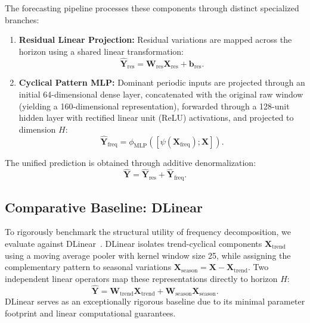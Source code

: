 \documentclass[journal]{IEEEtran}
\begin{document}
The forecasting pipeline processes these components through distinct specialized branches:
\begin{enumerate}
    \item \textbf{Residual Linear Projection:} Residual variations are mapped across the horizon using a shared linear transformation:
    \begin{equation}
    \widehat{\mathbf{Y}}_{\text{res}} = \mathbf{W}_{\text{res}} \mathbf{X}_{\text{res}} + \mathbf{b}_{\text{res}}.
    \end{equation}
    \item \textbf{Cyclical Pattern MLP:} Dominant periodic inputs are projected through an initial 64-dimensional dense layer, concatenated with the original raw window (yielding a 160-dimensional representation), forwarded through a 128-unit hidden layer with rectified linear unit (ReLU) activations, and projected to dimension $H$:
    \begin{equation}
    \widehat{\mathbf{Y}}_{\text{freq}} = \phi_{\text{MLP}}\left([\psi(\mathbf{X}_{\text{freq}}); \mathbf{X}]\right).
    \end{equation}
\end{enumerate}
The unified prediction is obtained through additive denormalization:
\begin{equation}
\widehat{\mathbf{Y}} = \widehat{\mathbf{Y}}_{\text{res}} + \widehat{\mathbf{Y}}_{\text{freq}}.
\end{equation}

\subsection{Comparative Baseline: DLinear}
To rigorously benchmark the structural utility of frequency decomposition, we evaluate against DLinear~\cite{zeng2023dlinear}. DLinear isolates trend-cyclical components $\mathbf{X}_{\text{trend}}$ using a moving average pooler with kernel window size 25, while assigning the complementary pattern to seasonal variations $\mathbf{X}_{\text{season}} = \mathbf{X} - \mathbf{X}_{\text{trend}}$. Two independent linear operators map these representations directly to horizon $H$:
\begin{equation}
\widehat{\mathbf{Y}} = \mathbf{W}_{\text{trend}} \mathbf{X}_{\text{trend}} + \mathbf{W}_{\text{season}} \mathbf{X}_{\text{season}}.
\end{equation}
DLinear serves as an exceptionally rigorous baseline due to its minimal parameter footprint and linear computational guarantees.
\end{document}
